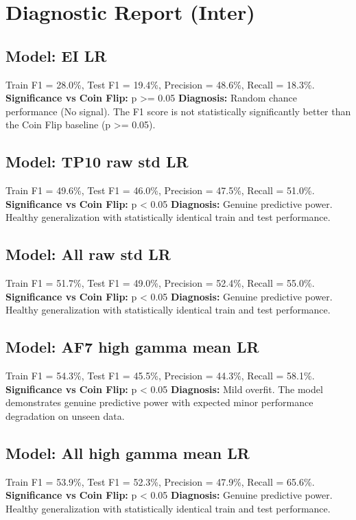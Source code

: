 \section*{Diagnostic Report (Inter)}
\subsection*{Model: EI LR}
Train F1 = 28.0\%, Test F1 = 19.4\%, Precision = 48.6\%, Recall = 18.3\%.
\newline
\textbf{Significance vs Coin Flip:} p >= 0.05
\newline
\textbf{Diagnosis:} Random chance performance (No signal). The F1 score is not statistically significantly better than the Coin Flip baseline (p >= 0.05).

\subsection*{Model: TP10 raw std LR}
Train F1 = 49.6\%, Test F1 = 46.0\%, Precision = 47.5\%, Recall = 51.0\%.
\newline
\textbf{Significance vs Coin Flip:} p < 0.05
\newline
\textbf{Diagnosis:} Genuine predictive power. Healthy generalization with statistically identical train and test performance.

\subsection*{Model: All raw std LR}
Train F1 = 51.7\%, Test F1 = 49.0\%, Precision = 52.4\%, Recall = 55.0\%.
\newline
\textbf{Significance vs Coin Flip:} p < 0.05
\newline
\textbf{Diagnosis:} Genuine predictive power. Healthy generalization with statistically identical train and test performance.

\subsection*{Model: AF7 high gamma mean LR}
Train F1 = 54.3\%, Test F1 = 45.5\%, Precision = 44.3\%, Recall = 58.1\%.
\newline
\textbf{Significance vs Coin Flip:} p < 0.05
\newline
\textbf{Diagnosis:} Mild overfit. The model demonstrates genuine predictive power with expected minor performance degradation on unseen data.

\subsection*{Model: All high gamma mean LR}
Train F1 = 53.9\%, Test F1 = 52.3\%, Precision = 47.9\%, Recall = 65.6\%.
\newline
\textbf{Significance vs Coin Flip:} p < 0.05
\newline
\textbf{Diagnosis:} Genuine predictive power. Healthy generalization with statistically identical train and test performance.
